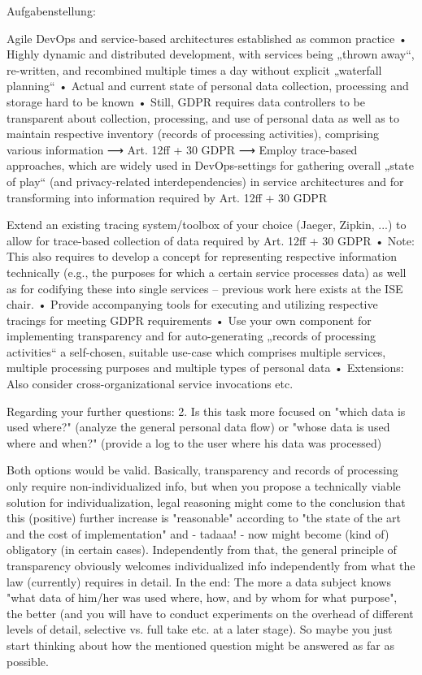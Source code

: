 Aufgabenstellung: 

Agile DevOps and service-based architectures established as common practice
• Highly dynamic and distributed development, with services being „thrown away“, re-written, and recombined multiple times a day without explicit „waterfall planning“
• Actual and current state of personal data collection, processing and storage hard to be known
• Still, GDPR requires data controllers to be transparent about collection, processing, and use of personal data as well as to maintain respective inventory (records of processing activities),
comprising various information ⟶ Art. 12ff + 30 GDPR
⟶ Employ trace-based approaches, which are widely used in DevOps-settings for gathering overall „state of play“ (and privacy-related interdependencies) in service architectures and for transforming into information required by Art. 12ff + 30 GDPR

Extend an existing tracing system/toolbox of your choice (Jaeger, Zipkin, ...) to allow for trace-based collection of data required by Art. 12ff + 30 GDPR
• Note: This also requires to develop a concept for representing respective information technically (e.g., the purposes for which a certain service processes data) as well as for codifying these into single services – previous work here exists at the ISE chair.
• Provide accompanying tools for executing and utilizing respective tracings for meeting GDPR requirements
• Use your own component for implementing transparency and for auto-generating „records of
processing activities“ a self-chosen, suitable use-case which comprises multiple services, multiple processing purposes and multiple types of personal data
• Extensions: Also consider cross-organizational service invocations etc.


Regarding your further questions:
    2. Is this task more focused on "which data is used where?" (analyze the general personal data flow) or "whose data is used where and when?" (provide a log to the user where his data was processed)

Both options would be valid. Basically, transparency and records of processing only require non-individualized info, but when you propose a technically viable solution for individualization, legal reasoning might come to the conclusion that this (positive) further increase is "reasonable" according to "the state of the art and the cost of implementation" and - tadaaa! - now might become (kind of) obligatory (in certain cases). Independently from that, the general principle of transparency obviously welcomes individualized info independently from what the law (currently) requires in detail. In the end: The more a data subject knows "what data of him/her was used where, how, and by whom for what purpose", the better (and you will have to conduct experiments on the overhead of different levels of detail, selective vs. full take etc. at a later stage). So maybe you just start thinking about how the mentioned question might be answered as far as possible.


